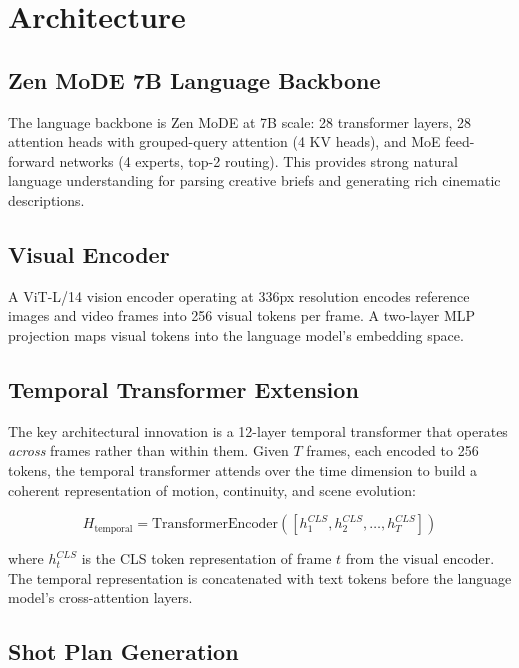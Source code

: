 \documentclass[11pt,a4paper]{article}
\begin{document}
\section{Architecture}

\subsection{Zen MoDE 7B Language Backbone}

The language backbone is Zen MoDE at 7B scale: 28 transformer layers, 28 attention heads with
grouped-query attention (4 KV heads), and MoE feed-forward networks (4 experts, top-2 routing).
This provides strong natural language understanding for parsing creative briefs and generating
rich cinematic descriptions.

\subsection{Visual Encoder}

A ViT-L/14 vision encoder operating at 336px resolution encodes reference images and video
frames into 256 visual tokens per frame. A two-layer MLP projection maps visual tokens into
the language model's embedding space.

\subsection{Temporal Transformer Extension}

The key architectural innovation is a 12-layer temporal transformer that operates \textit{across}
frames rather than within them. Given $T$ frames, each encoded to 256 tokens, the temporal
transformer attends over the time dimension to build a coherent representation of motion,
continuity, and scene evolution:

\begin{equation}
    H_{\text{temporal}} = \text{TransformerEncoder}([h_1^{CLS}, h_2^{CLS}, \ldots, h_T^{CLS}])
\end{equation}

where $h_t^{CLS}$ is the CLS token representation of frame $t$ from the visual encoder.
The temporal representation is concatenated with text tokens before the language model's
cross-attention layers.

\subsection{Shot Plan Generation}
\end{document}
